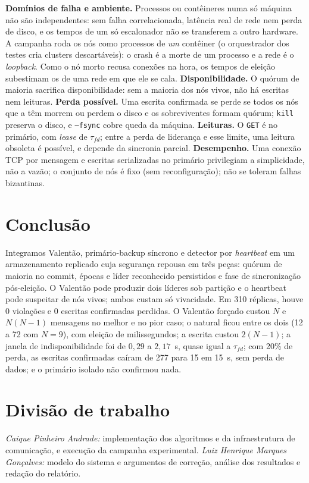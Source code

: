 \documentclass[conference,a4paper]{IEEEtran}
\begin{document}
\textbf{Domínios de falha e ambiente.} Processos ou contêineres numa só máquina
não são independentes: sem falha correlacionada, latência real de rede nem
perda de disco, e os tempos de um só escalonador não se transferem a outro
hardware. A campanha roda os nós como processos de \emph{um} contêiner (o
orquestrador dos testes cria clusters descartáveis): o crash é a morte de um
processo e a rede é o \emph{loopback}. Como o nó morto recusa conexões na hora,
os tempos de eleição subestimam os de uma rede em que ele se cala.
\textbf{Disponibilidade.} O quórum de maioria sacrifica disponibilidade:
sem a maioria dos nós vivos, não há escritas nem leituras.
\textbf{Perda possível.} Uma escrita confirmada se perde se todos os nós que
a têm morrem ou perdem o disco e os sobreviventes formam quórum; \texttt{kill}
preserva o disco, e \texttt{--fsync} cobre queda da máquina.
\textbf{Leituras.} O \texttt{GET} é no primário, com \emph{lease} de
$\tau_{fd}$; entre a perda de liderança e esse limite, uma leitura obsoleta é
possível, e depende da sincronia parcial. \textbf{Desempenho.} Uma conexão TCP por mensagem e escritas
serializadas no primário privilegiam a simplicidade, não a vazão; o conjunto
de nós é fixo (sem reconfiguração); não se toleram falhas bizantinas.

\section{Conclusão}

Integramos Valentão, primário-backup síncrono e detector por
\emph{heartbeat} em um armazenamento replicado cuja segurança repousa em três
peças: quórum de maioria no commit, épocas e líder reconhecido persistidos e
fase de sincronização pós-eleição. O Valentão pode produzir dois líderes sob
partição e o heartbeat pode suspeitar de nós vivos; ambos custam só
vivacidade. Em 310 réplicas, houve 0 violações e 0 escritas confirmadas
perdidas. O Valentão forçado custou $N$ e $N(N-1)$ mensagens no
melhor e no pior caso; o natural ficou entre os dois (12 a 72 com $N=9$), com
eleição de milissegundos; a escrita custou $2(N-1)$; a janela de
indisponibilidade foi de $0{,}29$ a $2{,}17$~s, quase igual a $\tau_{fd}$; com
20\% de perda, as escritas confirmadas caíram de 277 para 15 em 15~s, sem
perda de dados; e o primário isolado não confirmou nada.

\section*{Divisão de trabalho}
\noindent\textit{Caique Pinheiro Andrade:} implementação dos algoritmos e da
infraestrutura de comunicação, e execução da campanha experimental.
\textit{Luiz Henrique Marques Gonçalves:} modelo do sistema e argumentos de
correção, análise dos resultados e redação do relatório.
\end{document}
